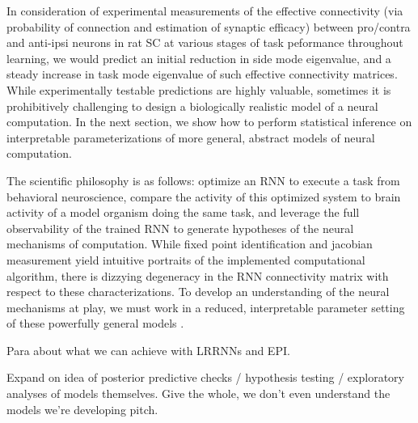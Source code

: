 \documentclass[11pt]{article}
\begin{document}
In consideration of experimental measurements of the effective connectivity (via probability of connection and estimation of synaptic efficacy) between pro/contra and anti-ipsi neurons in rat SC at various stages of task peformance throughout learning, we would predict an initial reduction in side mode eigenvalue, and a steady increase in task mode eigenvalue of such effective connectivity matrices.   While experimentally testable predictions are highly valuable, sometimes it is prohibitively challenging to design a biologically realistic model of a neural computation. In the next section, we show how to perform statistical inference on interpretable parameterizations of more general, abstract models of neural computation.

The scientific philosophy is as follows: optimize an RNN to execute a task from behavioral neuroscience, compare the activity of this optimized system to brain activity of a model organism doing the same task, and leverage the full observability of the trained RNN to generate hypotheses of the neural mechanisms of computation.  While fixed point identification and jacobian measurement yield intuitive portraits of the implemented computational algorithm, there is dizzying degeneracy in the RNN connectivity matrix with respect to these characterizations.  To develop an understanding of the neural mechanisms at play, we must work in a reduced, interpretable parameter setting of these powerfully general models \cite{doya1993universality}.

Para about what we can achieve with LRRNNs and EPI.

Expand on idea of posterior predictive checks / hypothesis testing / exploratory analyses of models themselves.  Give the whole, we don't even understand the models we're developing pitch.

\end{document}
